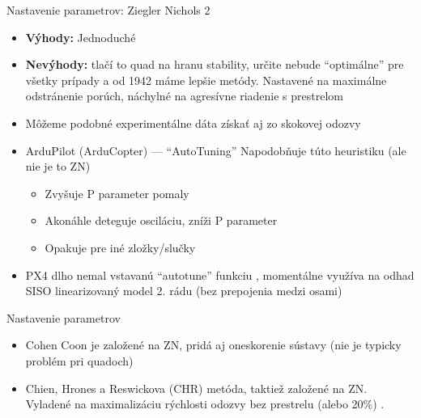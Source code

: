 \begin{frame}[t]{Nastavenie parametrov: Ziegler Nichols 2}
\begin{itemize}
  \item<1-> \textbf{Výhody:} Jednoduché
  \item<2-> \textbf{Nevýhody:} tlačí to quad na hranu stability, určite nebude ``optimálne'' pre všetky prípady a od 1942 máme lepšie metódy. Nastavené na maximálne odstránenie porúch, náchylné na agresívne riadenie s prestrelom \cite{Bequette2010}
     \item<3-> Môžeme podobné experimentálne dáta získať aj zo skokovej odozvy
  \item<4-> ArduPilot (ArduCopter) --- ``AutoTuning'' Napodobňuje túto heuristiku (ale nie je to ZN) \citep{AP:LogSeminar}
  \begin{itemize}
  \item Zvyšuje P parameter pomaly
  \item Akonáhle deteguje osciláciu, zníži P parameter
  \item Opakuje pre iné zložky/slučky
\end{itemize}
\item<5-> PX4 dlho nemal vstavanú ``autotune'' funkciu \citep{Bolton2018}, momentálne využíva na odhad SISO linearizovaný model 2. rádu  (bez prepojenia medzi osami) \citep{PX4:PIDTuning}
\end{itemize}

\end{frame}


\begin{frame}[t]{Nastavenie parametrov}
\begin{itemize}
  \item<1-> Cohen Coon je založené na ZN, pridá aj oneskorenie sústavy \citep{Joseph2018} (nie je typicky problém pri quadoch)
  \item<2-> Chien, Hrones a Reswickova (CHR) metóda, taktiež založené na ZN. Vyladené na maximalizáciu rýchlosti odozvy bez prestrelu (alebo 20\%) \citep{Hambali2014}.

\end{itemize}
\end{frame} 